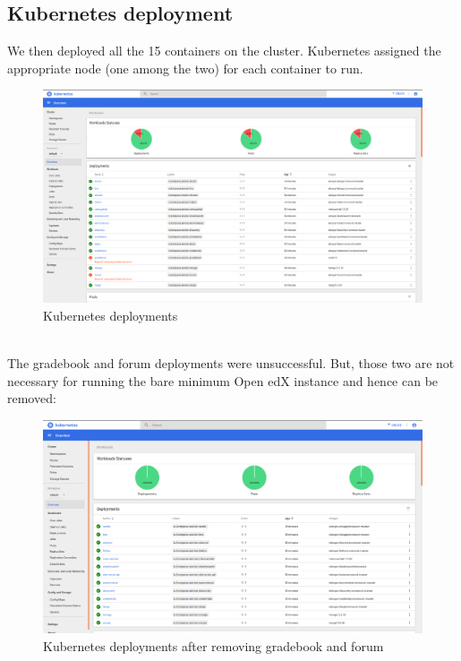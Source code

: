 \documentclass[12pt]{article}
\begin{document}
\subsection{Kubernetes deployment}
We then deployed all the 15 containers on the cluster. Kubernetes assigned the appropriate node (one among the two) for each container to run.
\begin{figure}[h!]
	\begin{center}
		\includegraphics[totalheight=0.34\textheight]{fgcrash}
		\caption{Kubernetes deployments}
	\end{center}
\end{figure}
\\The gradebook and forum deployments were unsuccessful. But, those two are not necessary for running the bare minimum Open edX instance and hence can be removed:
\begin{figure}[h!]
	\begin{center}
		\includegraphics[totalheight=0.34\textheight]{dep100}
		\caption{Kubernetes deployments after removing gradebook and forum}
	\end{center}
\end{figure}
\end{document}
